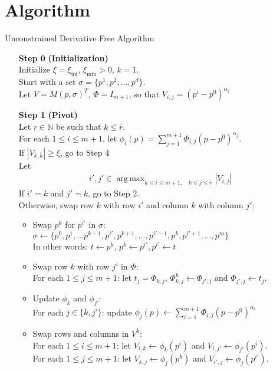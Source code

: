 \documentclass{article}
\theoremstyle{case}
\DeclareMathOperator*{\argmax}{arg\,max}
\newcommand{\naturals}{\mathbb N}
\newcommand{\ximin}{{\xi_{\textrm{min}}}}
\newcommand{\xiini}{{\xi_{\textrm{ini}}}}
\begin{document}
\section{Algorithm}

\newpage
\begin{algorithm}[H]
    \caption{Unconstrained Derivative Free Algorithm}
    \label{full_pivot_model_improve}
    \begin{itemize}
        \item[\textbf{Step 0}] \textbf{(Initialization)} \\
            Initialize $\xi = \xiini$, $\ximin > 0$, $k=1$. \\
            Start with a set $\sigma = \{p^1, p^2, \ldots, p^d\}$. \\
            Let $V = M(p, \sigma)^T$, $\Phi = I_{m+1}$, so that $V_{i,j} = (p^i - p^0)^{\alpha_j}$
            
        \item[\textbf{Step 1}] \textbf{(Pivot)} \\
        	Let $r \in \naturals$ be such that $k \le \overline r$. \\
        	For each $1\le i \le m+1$, let $\phi_i(p) = \sum_{j=1}^{m+1} \Phi_{i, j} (p - p^0)^{\alpha_j}$. \\
        	If $|V_{k,k}| \ge \xi$, go to Step 4 \\
        	Let 
\begin{align*}
	i', j' \in \argmax_{k\le i \le m+1, \quad k \le j \le \overline r} |V_{i, j}|
\end{align*}
			If $i' = k$ and $j' = k$, go to Step 2. \\
			Otherwise, swap row $k$ with row $i'$ and column $k$ with column $j'$:
			\begin{itemize}
				\item Swap $p^k$ for $p^{i'}$ in $\sigma$: \\
					$\sigma \gets \{p^0, p^1, \ldots p^{k-1}, p^{i'}, p^{k+1}, \ldots, p^{i'-1}, p^{k}, p^{i'+1}, \ldots, p^m\}$ \\
					In other words: $t \gets p^k$, $p^k \gets p^{i'}, p^{i'} \gets t$
				\item Swap row $k$ with row $j'$ in $\Phi$: \\
					For each $1 \le j \le m+1$: let $t_j = \Phi_{k, j}$, $\Phi^k_{k, j} \gets \Phi_{j', j}$ and $\Phi_{j', j} \gets t_j$.
				\item Update $\phi_k$ and $\phi_{j'}$: \\
					For each $j \in \{k, j'\}$: update $\phi_j(p) \gets \sum_{i=1}^{m+1} \Phi_{i, j} (p - p^0)^{\alpha_i}$
				\item Swap rows and columns in $V^k$:\\
					For each $1 \le i \le m+1$: let $V_{i, k} \gets \phi_k(p^i)$ and $V_{i, j'} \gets \phi_{j'}(p^i)$.\\ 
					For each $1 \le j \le m+1$: let $V_{k, j} \gets \phi_j(p^k)$ and $V_{i', j} \gets \phi_{j}(p^{i'})$.
			\end{itemize}
			

\end{itemize}
\end{algorithm}
\end{document}
